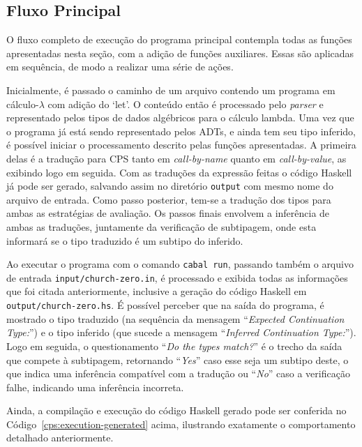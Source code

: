 \subsection{Fluxo Principal}\label{subsec:cps-main-program}
O fluxo completo de execução do programa principal contempla todas as funções apresentadas nesta seção, com a adição de funções auxiliares.
Essas são aplicadas em sequência, de modo a realizar uma série de ações.

Inicialmente, é passado o caminho de um arquivo contendo um programa em cálculo-$\lambda$ com adição do `let'.
O conteúdo então é processado pelo \textit{parser} e representado pelos tipos de dados algébricos para o cálculo lambda.
Uma vez que o programa já está sendo representado pelos ADTs, e ainda tem seu tipo inferido, é possível iniciar o processamento descrito pelas funções apresentadas.
A primeira delas é a tradução para CPS tanto em \textit{call-by-name} quanto em \textit{call-by-value}, as exibindo logo em seguida.
Com as traduções da expressão feitas o código Haskell já pode ser gerado, salvando assim no diretório \texttt{output} com mesmo nome do arquivo de entrada.
Como passo posterior, tem-se a tradução dos tipos para ambas as estratégias de avaliação.
Os passos finais envolvem a inferência de ambas as traduções, juntamente da verificação de subtipagem, onde esta informará se o tipo traduzido é um subtipo do inferido.

\lstset{extendedchars=false, escapeinside=''}

Ao executar o programa com o comando \texttt{cabal run}, passando também o arquivo de entrada \texttt{input/church-zero.in}, é processado e exibida todas as informações que foi citada anteriormente, inclusive a geração do código Haskell em \texttt{output/church-zero.hs}.
É possível perceber que na saída do programa, é mostrado o tipo traduzido (na sequência da mensagem ``\textit{Expected Continuation Type:}'') e o tipo inferido (que sucede a mensagem ``\textit{Inferred Continuation Type:}'').
Logo em seguida, o questionamento ``\textit{Do the types match?}'' é o trecho da saída que compete à subtipagem, retornando ``\textit{Yes}'' caso esse seja um subtipo deste, o que indica uma inferência compatível com a tradução ou ``\textit{No}'' caso a verificação falhe, indicando uma inferência incorreta.

\lstset{extendedchars=false, escapeinside=''}

Ainda, a compilação e execução do código Haskell gerado pode ser conferida no Código~\ref{cps:execution-generated} acima, ilustrando exatamente o comportamento detalhado anteriormente.
